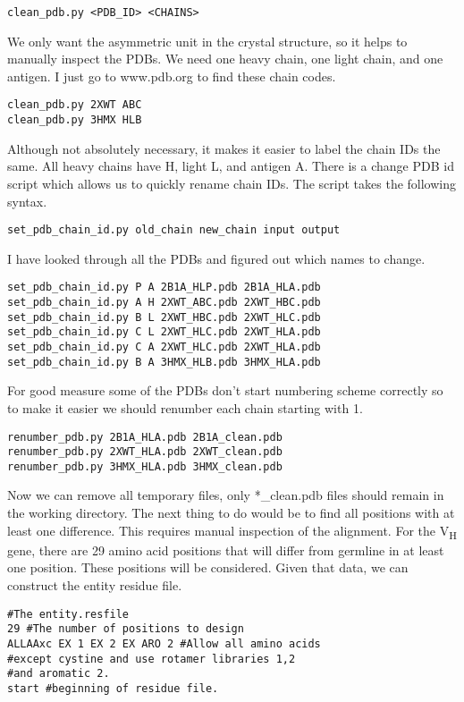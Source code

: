 \lstset{language=bash}
\begin{lstlisting}
clean_pdb.py <PDB_ID> <CHAINS>
\end{lstlisting}

We only want the asymmetric unit in the crystal structure, so it helps to manually inspect the PDBs. We need one heavy chain, one light chain, and one antigen. I just go to www.pdb.org to find these chain codes.
\begin{lstlisting}
clean_pdb.py 2XWT ABC
clean_pdb.py 3HMX HLB
\end{lstlisting}
Although not absolutely necessary, it makes it easier to label the chain IDs the same. All heavy chains have H, light L, and antigen A. There is a change PDB id script which allows us to quickly rename chain IDs. The script takes the following syntax.

\begin{lstlisting}
set_pdb_chain_id.py old_chain new_chain input output
\end{lstlisting}
I have looked through all the PDBs and figured out which names to change.

\begin{lstlisting}
set_pdb_chain_id.py P A 2B1A_HLP.pdb 2B1A_HLA.pdb
set_pdb_chain_id.py A H 2XWT_ABC.pdb 2XWT_HBC.pdb
set_pdb_chain_id.py B L 2XWT_HBC.pdb 2XWT_HLC.pdb
set_pdb_chain_id.py C L 2XWT_HLC.pdb 2XWT_HLA.pdb
set_pdb_chain_id.py C A 2XWT_HLC.pdb 2XWT_HLA.pdb
set_pdb_chain_id.py B A 3HMX_HLB.pdb 3HMX_HLA.pdb
\end{lstlisting}
For good measure some of the PDBs don't start numbering scheme correctly so to make it easier we should renumber each chain starting with 1.

\begin{lstlisting}
renumber_pdb.py 2B1A_HLA.pdb 2B1A_clean.pdb
renumber_pdb.py 2XWT_HLA.pdb 2XWT_clean.pdb
renumber_pdb.py 3HMX_HLA.pdb 3HMX_clean.pdb
\end{lstlisting}
Now we can remove all temporary files, only *\_clean.pdb files should remain in the working directory. The next thing to do would be to find all positions with at least one difference. This requires manual inspection of the alignment. For the V\textsubscript{H} gene, there are 29 amino acid positions that will differ from germline in at least one position. These positions will be considered. Given that data, we can construct the entity residue file.

\begin{lstlisting}
#The entity.resfile
29 #The number of positions to design
ALLAAxc EX 1 EX 2 EX ARO 2 #Allow all amino acids
#except cystine and use rotamer libraries 1,2
#and aromatic 2.
start #beginning of residue file.
\end{lstlisting}


